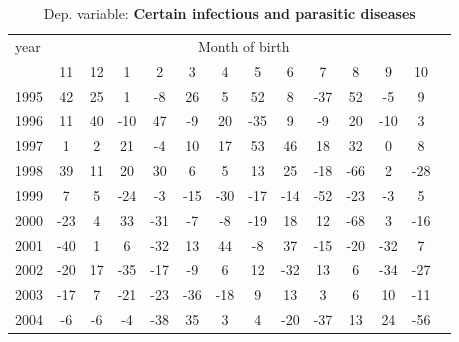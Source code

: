  \begin{table}[H] \begin{threeparttable} \centering \caption{Dep. variable: \textbf{Certain infectious and parasitic diseases}} {\def\sym#1{\ifmmode^{#1}\else\(^{#1}\)\fi} \begin{tabular}{l*{13}{c}} \toprule year & \multicolumn{12}{c}{Month of birth} \\ \cmidrule(lr){2-13} 
            &          11&          12&           1&           2&           3&           4&           5&           6&           7&           8&           9&          10\\
1995        &          42&          25&           1&          -8&          26&           5&          52&           8&         -37&          52&          -5&           9\\
1996        &          11&          40&         -10&          47&          -9&          20&         -35&           9&          -9&          20&         -10&           3\\
1997        &           1&           2&          21&          -4&          10&          17&          53&          46&          18&          32&           0&           8\\
1998        &          39&          11&          20&          30&           6&           5&          13&          25&         -18&         -66&           2&         -28\\
1999        &           7&           5&         -24&          -3&         -15&         -30&         -17&         -14&         -52&         -23&          -3&           5\\
2000        &         -23&           4&          33&         -31&          -7&          -8&         -19&          18&          12&         -68&           3&         -16\\
2001        &         -40&           1&           6&         -32&          13&          44&          -8&          37&         -15&         -20&         -32&           7\\
2002        &         -20&          17&         -35&         -17&          -9&           6&          12&         -32&          13&           6&         -34&         -27\\
2003        &         -17&           7&         -21&         -23&         -36&         -18&           9&          13&           3&           6&          10&         -11\\
2004        &          -6&          -6&          -4&         -38&          35&           3&           4&         -20&         -37&          13&          24&         -56\\

\end{tabular}}
\end{threeparttable}
\end{table}
